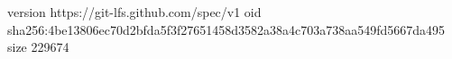 version https://git-lfs.github.com/spec/v1
oid sha256:4be13806ec70d2bfda5f3f27651458d3582a38a4c703a738aa549fd5667da495
size 229674
